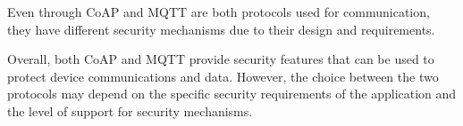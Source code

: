 Even through \acs{CoAP} and \acs{MQTT} are both protocols used for communication, they have different security mechanisms due to their design and requirements.

Overall, both \acs{CoAP} and \acs{MQTT} provide security features that can be used to protect device communications and data. 
However, the choice between the two protocols may depend on the specific security requirements of the application and the level of support for security mechanisms.

\clearpage
